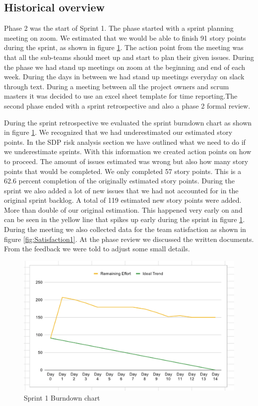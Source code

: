 \documentclass{article}
\begin{document}
\subsection{Historical overview}
Phase 2 was the start of Sprint 1. The phase started with a sprint planning meeting on zoom. We estimated that we would be able to finish 91 story points during the sprint, as shown in figure \ref{fig:Burndown1}. The action point from the meeting was that all the sub-teams should meet up and start to plan their given issues. During the phase we had stand up meetings on zoom at the beginning and end of each week. During the days in between we had stand up meetings everyday on slack through text. During a meeting between all the project owners and scrum masters it was decided to use an excel sheet template for time reporting.The second phase ended with a sprint retrospective and also a phase 2 formal review. 

During the sprint retrospective we evaluated the sprint burndown chart as shown in figure \ref{fig:Burndown1}. We recognized that we had underestimated our estimated story points. In the SDP risk analysis section we have outlined what we need to do if we underestimate sprints. With this information we created action points on how to proceed. The amount of issues estimated was wrong but also how many story points that would be completed. We only completed 57 story points. This is a 62.6 percent completion of the originally estimated story points. During the sprint we also added a lot of new issues that we had not accounted for in the original sprint backlog. A total of 119 estimated new story points were added. More than double of our original estimation. This happened very early on and can be seen in the yellow line that spikes up early during the sprint in figure \ref{fig:Burndown1}. During the meeting we also collected data for the team satisfaction as shown in figure \ref{fig:Satisfaction1}. At the phase review we discussed the written documents. From the feedback we were told to adjust some small details.

\begin{figure}[h!]
    \centering
    \includegraphics[scale=0.6]{pfrFigures/Sprint1.png}
    \caption{Sprint 1 Burndown chart}
    \label{fig:Burndown1}
\end{figure}
\end{document}
